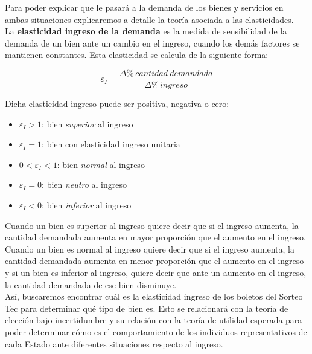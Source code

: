 Para poder explicar que le pasará a la demanda de los bienes y servicios en ambas situaciones explicaremos a detalle la teoría asociada a las elasticidades. \\

La \textbf{elasticidad ingreso de la demanda}  es la medida de sensibilidad de la demanda de un bien ante un cambio en el ingreso, cuando los demás factores se mantienen constantes. Esta elasticidad se calcula de la siguiente forma:

$$
\varepsilon_I= \frac{ \Delta \% \: cantidad \: demandada}{\Delta \% \, ingreso}
$$

Dicha elasticidad ingreso puede ser positiva, negativa o cero:

\begin{itemize}
    \item $\varepsilon_I > 1$: bien \textit{superior} al ingreso
    \item $\varepsilon_I = 1$: bien con elasticidad ingreso unitaria
    \item $0 < \varepsilon_I < 1$: bien \textit{normal} al ingreso
    \item $\varepsilon_I = 0$: bien \textit{neutro} al ingreso
    \item $\varepsilon_I < 0$: bien \textit{inferior} al ingreso
\end{itemize}{}

Cuando un bien es superior al ingreso quiere decir que si el ingreso aumenta, la cantidad demandada aumenta en mayor proporción que el aumento en el ingreso. Cuando un bien es normal al ingreso quiere decir que si el ingreso aumenta, la cantidad demandada aumenta en menor proporción que el aumento en el ingreso y si un bien es inferior al ingreso, quiere decir que ante un aumento en el ingreso, la cantidad demandada de ese bien disminuye. \\

Así, buscaremos encontrar cuál es la elasticidad ingreso de los boletos del Sorteo Tec para determinar qué tipo de bien es. Esto se relacionará con la teoría de elección bajo incertidumbre y su relación con la teoría de utilidad esperada para poder determinar cómo es el comportamiento de los individuos representativos de cada Estado ante diferentes situaciones respecto al ingreso. \\




